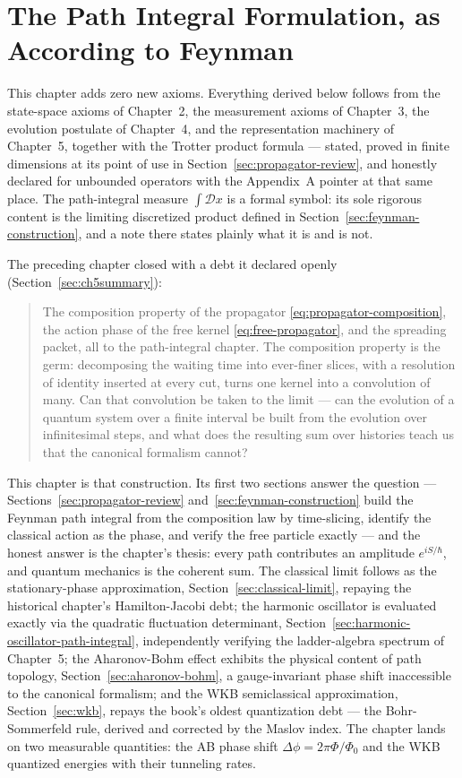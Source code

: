 ﻿\chapter{The Path Integral Formulation, as According to Feynman}

\begin{note}
This chapter adds zero new axioms. Everything derived below follows from the state-space axioms of Chapter~2, the measurement axioms of Chapter~3, the evolution postulate of Chapter~4, and the representation machinery of Chapter~5, together with the Trotter product formula --- stated, proved in finite dimensions at its point of use in Section~\ref{sec:propagator-review}, and honestly declared for unbounded operators with the Appendix~A pointer at that same place. The path-integral measure $\int\mathcal{D}x$ is a formal symbol: its sole rigorous content is the limiting discretized product defined in Section~\ref{sec:feynman-construction}, and a note there states plainly what it is and is not.
\end{note}

The preceding chapter closed with a debt it declared openly (Section~\ref{sec:ch5summary}):
\begin{quote}
The composition property of the propagator \eqref{eq:propagator-composition}, the action phase of the free kernel \eqref{eq:free-propagator}, and the spreading packet, all to the path-integral chapter. The composition property is the germ: decomposing the waiting time into ever-finer slices, with a resolution of identity inserted at every cut, turns one kernel into a convolution of many. Can that convolution be taken to the limit --- can the evolution of a quantum system over a finite interval be built from the evolution over infinitesimal steps, and what does the resulting sum over histories teach us that the canonical formalism cannot?
\end{quote}
This chapter is that construction. Its first two sections answer the question --- Sections~\ref{sec:propagator-review} and~\ref{sec:feynman-construction} build the Feynman path integral from the composition law by time-slicing, identify the classical action as the phase, and verify the free particle exactly --- and the honest answer is the chapter's thesis: every path contributes an amplitude $e^{iS/\hbar}$, and quantum mechanics is the coherent sum. The classical limit follows as the stationary-phase approximation, Section~\ref{sec:classical-limit}, repaying the historical chapter's Hamilton-Jacobi debt; the harmonic oscillator is evaluated exactly via the quadratic fluctuation determinant, Section~\ref{sec:harmonic-oscillator-path-integral}, independently verifying the ladder-algebra spectrum of Chapter~5; the Aharonov-Bohm effect exhibits the physical content of path topology, Section~\ref{sec:aharonov-bohm}, a gauge-invariant phase shift inaccessible to the canonical formalism; and the WKB semiclassical approximation, Section~\ref{sec:wkb}, repays the book's oldest quantization debt --- the Bohr-Sommerfeld rule, derived and corrected by the Maslov index. The chapter lands on two measurable quantities: the AB phase shift $\Delta\phi = 2\pi\Phi/\Phi_0$ and the WKB quantized energies with their tunneling rates.

